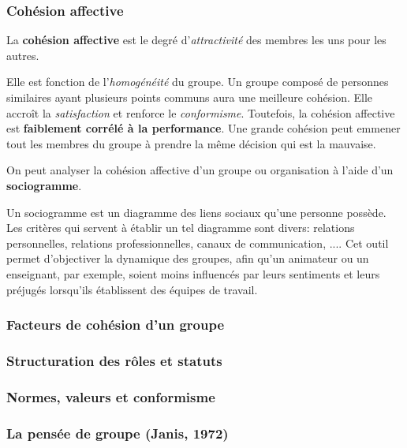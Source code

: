 \documentclass[12pt]{article}
\begin{document}
				
		\subsubsection{Cohésion affective}
		
		La \textbf{cohésion affective} est le degré d'\textit{attractivité} des membres les uns pour les autres.	\newline
		
		Elle est fonction de l'\textit{homogénéité} du groupe. Un groupe composé de personnes similaires ayant plusieurs points communs aura une meilleure cohésion. Elle accroît la \textit{satisfaction} et renforce le \textit{conformisme}. Toutefois, la cohésion affective est \textbf{faiblement corrélé à la performance}. Une grande cohésion peut emmener tout les membres du groupe à prendre la même décision qui est la mauvaise. \newline
		
		On peut analyser la cohésion affective d'un groupe ou organisation à l'aide d'un \textbf{sociogramme}. \newline 
		
		Un sociogramme est un diagramme des liens sociaux qu'une personne possède. Les critères qui servent à établir un tel diagramme sont divers: relations personnelles, relations professionnelles, canaux de communication, .... Cet outil permet d'objectiver la dynamique des groupes, afin qu'un animateur ou un enseignant, par exemple, soient moins influencés par leurs sentiments et leurs préjugés lorsqu'ils établissent des équipes de travail.\newline
		
		
		\subsubsection{Facteurs de cohésion d’un groupe}
		
		
				
		\subsubsection{Structuration des rôles et statuts}
		
		
		
		\subsubsection{Normes, valeurs et conformisme}
		\subsubsection{La pensée de groupe (Janis, 1972)}
\end{document}
